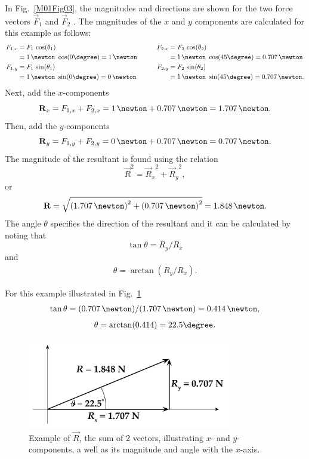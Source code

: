 In Fig.~\ref{M01Fig03}, the magnitudes and directions are shown for the two force vectors $\vec{F}_1$ and $\vec{F}_2$ . The magnitudes of the $x$ and $y$ components are calculated for this example as follows:
\begin{equation}
\label{Eq:M1_cosSinAngle}
  \begin{aligned} %
    F_{1,x} & = F_1 \, \cos(\theta_{1}) & \qquad F_{2,x} & = F_2 \, \cos(\theta_{2}) \\
            & = 1\,\newton\ \cos(0\degree) = 1\,\newton & &  = 1\,\newton\ \cos(45\degree) = 0.707\,\newton \\
    F_{1,y} & = F_1 \,\sin(\theta_1) & \qquad F_{2,y} & = F_2 \,\sin(\theta_2) \\
            & = 1\,\newton\ \sin(0\degree) = 0\,\newton & &  = 1\,\newton\ \sin(45\degree) = 0.707\,\newton.
  \end{aligned}
\end{equation}
Next, add the $x$-components
\[
  \vec{R}_x = F_{1,x} + F_{2,x} = 1\,\newton + 0.707\,\newton = 1.707\,\newton.
\]
Then, add the $y$-components
\[
  \vec{R}_y = F_{1,y} + F_{2,y} = 0\,\newton + 0.707\,\newton = 0.707\,\newton.
\]
The magnitude of the resultant is found using the relation
\begin{equation}
\label{Eq:M1_resultantMag}
	\vec{R}^2 = {\vec{R}_x}^2 + {\vec{R}_y}^2,
\end{equation}
or
\[
  \vec{R} = \sqrt{\left(1.707\,\newton\right)^2 +
    \left(0.707\,\newton\right)^2} = 1.848\,\newton.
\]
The angle $\theta$ specifies the direction of the resultant and it can be calculated by noting that
\begin{equation}
  \tan\theta = R_{y} / R_{x}
\end{equation}
and
\begin{align} %
\label{Eq:M1_arctan}
  \theta = \arctan (R_{y} / R_{x}).
\end{align}

For this example illustrated in Fig.~\ref{M01Fig04}
\begin{align} %
  \tan \theta = (0.707\,\newton) / (1.707\,\newton) = 0.414\,\newton,
\end{align}
\begin{align} %
  \theta = \arctan(0.414) = 22.5\degree.
\end{align}

\begin{figure}[h]
  \begin{center}
    \includegraphics[width=3.5in]{Experiment01Figures/Figure04.pdf}
  \end{center}
  \caption{Example of $\vec{R}$, the sum of 2 vectors, illustrating $x$- and $y$-components, a well as its magnitude and angle with the $x$-axis.}
  \label{M01Fig04} 
\end{figure}



